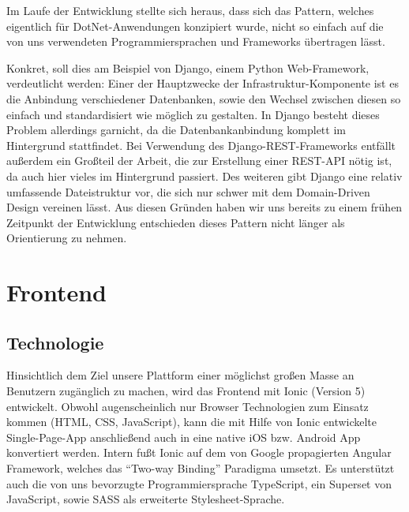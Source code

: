 \documentclass{article}
\begin{document}

Im Laufe der Entwicklung stellte sich heraus, dass sich das Pattern, welches eigentlich für DotNet-Anwendungen konzipiert wurde, nicht so einfach auf die von uns verwendeten Programmiersprachen und Frameworks übertragen lässt. 

Konkret, soll dies am Beispiel von Django, einem Python Web-Framework, verdeutlicht werden: Einer der Hauptzwecke der Infrastruktur-Komponente ist es die Anbindung verschiedener Datenbanken, sowie den Wechsel zwischen diesen so einfach und standardisiert wie möglich zu gestalten. In Django besteht dieses Problem allerdings garnicht, da die Datenbankanbindung komplett im Hintergrund stattfindet. Bei Verwendung des Django-REST-Frameworks entfällt außerdem ein Großteil der Arbeit, die zur Erstellung einer REST-API nötig ist, da auch hier vieles im Hintergrund passiert. Des weiteren gibt Django eine relativ umfassende Dateistruktur vor, die sich nur schwer mit dem Domain-Driven Design vereinen lässt. Aus diesen Gründen haben wir uns bereits zu einem frühen Zeitpunkt der Entwicklung entschieden dieses Pattern nicht länger als Orientierung zu nehmen.


\section{Frontend} %


\subsection{Technologie}
\label{sec:frontend-tech}

Hinsichtlich dem Ziel unsere Plattform einer möglichst großen Masse an Benutzern zugänglich zu machen, wird das Frontend mit Ionic (Version 5) entwickelt. Obwohl augenscheinlich nur Browser Technologien zum Einsatz kommen (HTML, CSS, JavaScript), kann die mit Hilfe von Ionic entwickelte Single-Page-App anschließend auch in eine native iOS bzw. Android App konvertiert werden. Intern fußt Ionic auf dem von Google propagierten Angular Framework, welches das \enquote{Two-way Binding} Paradigma umsetzt. Es unterstützt auch die von uns bevorzugte Programmiersprache TypeScript, ein Superset von JavaScript, sowie SASS als erweiterte Stylesheet-Sprache. 
\end{document}
